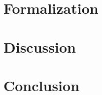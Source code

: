 \documentclass[runningheads,a4paper]{llncs2e/llncs}
\begin{document}



\section{Formalization}




\section{Discussion}



\section*{Conclusion}











%
\end{document}
